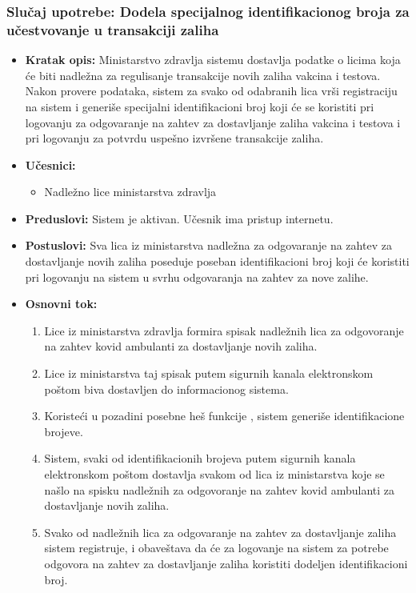 \documentclass[titlepage]{article}
\begin{document}
\subsubsection{Slučaj upotrebe: Dodela specijalnog identifikacionog broja za u\v{c}estvovanje u transakciji zaliha}
\begin{itemize}
    
\item \textbf{Kratak opis:} Ministarstvo zdravlja sistemu dostavlja podatke  o licima koja \'{c}e biti nadle\v{z}na za regulisanje transakcije  novih zaliha vakcina i testova. Nakon provere podataka, sistem za svako od odabranih lica vr\v{s}i registraciju na sistem i generi\v{s}e specijalni identifikacioni broj koji će se koristiti pri logovanju za odgovaranje na zahtev za dostavljanje zaliha vakcina i testova i pri logovanju za potvrdu uspe\v{s}no izvr\v{s}ene transakcije zaliha. 
\item \textbf{Učesnici:}
\begin{itemize}
    \item Nadležno lice ministarstva zdravlja
\end{itemize}
 \item \textbf{Preduslovi:} Sistem je aktivan. Učesnik ima pristup internetu.
 \item \textbf{Postuslovi:} Sva lica iz ministarstva nadle\v{z}na za odgovaranje na zahtev za dostavljanje novih zaliha poseduje poseban identifikacioni broj koji će koristiti pri logovanju na sistem u svrhu odgovaranja na zahtev za nove zalihe.
 \item \textbf{Osnovni tok:}
 \begin{enumerate}
    \item Lice iz ministarstva zdravlja formira spisak nadle\v{z}nih lica za odgovoranje na zahtev kovid ambulanti za dostavljanje novih zaliha.
    \item Lice iz ministarstva taj spisak putem sigurnih kanala elektronskom poštom biva dostavljen do informacionog sistema.
    \item Koristeći u pozadini posebne he\v{s} funkcije , sistem generi\v{s}e identifikacione brojeve.
    \item Sistem, svaki od identifikacionih brojeva putem sigurnih kanala elektronskom poštom dostavlja svakom od lica iz ministarstva koje se na\v{s}lo na spisku nadle\v{z}nih za odgovoranje na zahtev kovid ambulanti za dostavljanje novih zaliha.
    \item Svako od nadle\v{z}nih lica za odgovaranje na zahtev za dostavljanje zaliha sistem registruje, i obaveštava da \'{c}e za logovanje na sistem za potrebe odgovora na zahtev za dostavljanje zaliha koristiti dodeljen identifikacioni broj.
 \end{enumerate}
\end{itemize}
\end{document}
